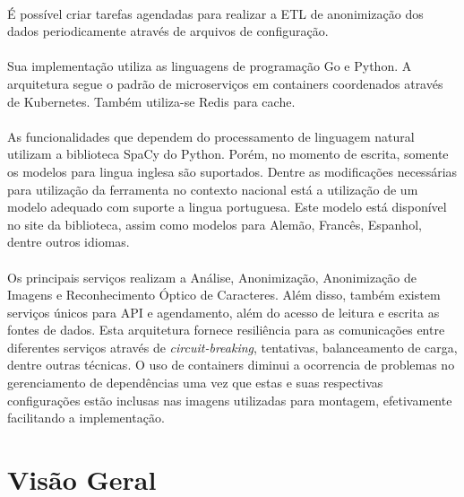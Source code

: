 \paragraph{} É possível criar tarefas agendadas para realizar a ETL de anonimização dos dados periodicamente através de arquivos de configuração.

\paragraph{} Sua implementação utiliza as linguagens de programação Go e Python. A arquitetura segue o padrão de microserviços em containers coordenados através de Kubernetes. Também utiliza-se Redis para cache.

\paragraph{} As funcionalidades que dependem do processamento de linguagem natural utilizam a biblioteca SpaCy do Python. Porém, no momento de escrita, somente
os modelos para lingua inglesa são suportados.\cite{presidio-issue303} Dentre as modificações necessárias para utilização da ferramenta no contexto nacional está a utilização de um modelo
adequado com suporte a lingua portuguesa. Este modelo está disponível no site da biblioteca\cite{spacy}, assim como modelos para Alemão, Francês, Espanhol, dentre outros idiomas.

\paragraph{} Os principais serviços realizam a Análise, Anonimização, Anonimização de Imagens e Reconhecimento Óptico de Caracteres. 
Além disso, também existem serviços únicos para API e agendamento, além do acesso de leitura e escrita as fontes de dados. Esta arquitetura fornece resiliência para
as comunicações entre diferentes serviços através de \textit{circuit-breaking}, tentativas, balanceamento de carga, dentre outras técnicas. 
O uso de containers diminui a ocorrencia de problemas no gerenciamento de dependências\cite{merkel2014docker} uma vez que estas e suas respectivas configurações
estão inclusas nas imagens utilizadas para montagem, efetivamente facilitando a implementação.



\section{Visão Geral}